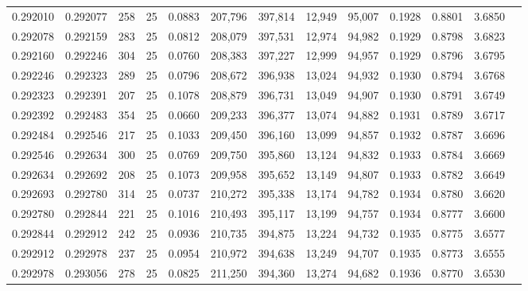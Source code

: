 \begin{tabular}{rrrrrrrrrrrrr}
0.292010 & 0.292077 &   258 &  25 &                                     0.0883 & 207,796 & 397,814 &  12,949 &  95,007 & 0.1928 & 0.8801 & 3.6850 \\
0.292078 & 0.292159 &   283 &  25 &                                     0.0812 & 208,079 & 397,531 &  12,974 &  94,982 & 0.1929 & 0.8798 & 3.6823 \\
0.292160 & 0.292246 &   304 &  25 &                                     0.0760 & 208,383 & 397,227 &  12,999 &  94,957 & 0.1929 & 0.8796 & 3.6795 \\
0.292246 & 0.292323 &   289 &  25 &                                     0.0796 & 208,672 & 396,938 &  13,024 &  94,932 & 0.1930 & 0.8794 & 3.6768 \\
0.292323 & 0.292391 &   207 &  25 &                                     0.1078 & 208,879 & 396,731 &  13,049 &  94,907 & 0.1930 & 0.8791 & 3.6749 \\
0.292392 & 0.292483 &   354 &  25 &                                     0.0660 & 209,233 & 396,377 &  13,074 &  94,882 & 0.1931 & 0.8789 & 3.6717 \\
0.292484 & 0.292546 &   217 &  25 &                                     0.1033 & 209,450 & 396,160 &  13,099 &  94,857 & 0.1932 & 0.8787 & 3.6696 \\
0.292546 & 0.292634 &   300 &  25 &                                     0.0769 & 209,750 & 395,860 &  13,124 &  94,832 & 0.1933 & 0.8784 & 3.6669 \\
0.292634 & 0.292692 &   208 &  25 &                                     0.1073 & 209,958 & 395,652 &  13,149 &  94,807 & 0.1933 & 0.8782 & 3.6649 \\
0.292693 & 0.292780 &   314 &  25 &                                     0.0737 & 210,272 & 395,338 &  13,174 &  94,782 & 0.1934 & 0.8780 & 3.6620 \\
0.292780 & 0.292844 &   221 &  25 &                                     0.1016 & 210,493 & 395,117 &  13,199 &  94,757 & 0.1934 & 0.8777 & 3.6600 \\
0.292844 & 0.292912 &   242 &  25 &                                     0.0936 & 210,735 & 394,875 &  13,224 &  94,732 & 0.1935 & 0.8775 & 3.6577 \\
0.292912 & 0.292978 &   237 &  25 &                                     0.0954 & 210,972 & 394,638 &  13,249 &  94,707 & 0.1935 & 0.8773 & 3.6555 \\
0.292978 & 0.293056 &   278 &  25 &                                     0.0825 & 211,250 & 394,360 &  13,274 &  94,682 & 0.1936 & 0.8770 & 3.6530 \\

\end{tabular}
